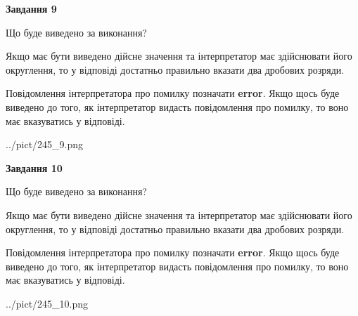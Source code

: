 \documentclass[12pt, ukrainian]{article}
\begin{document}
{\begin {Large}
{\begin {center}\textbf{Завдання 9}\end {center}}\par
Що буде виведено за виконання? \par

Якщо має бути виведено дійсне значення та інтерпретатор має здійснювати його округлення, 
то у відповіді достатньо правильно вказати два дробових розряди.

Повідомлення інтерпретатора про помилку позначати \textbf{error}.
Якщо щось буде виведено до того, як інтерпретатор видасть повідомлення про помилку, 
то воно має вказуватись у відповіді. \par

\begin{center}
	{../pict/245_9.png}
\end{center}
\newpage

{\begin {center}\textbf{Завдання 10}\end {center}}\par
Що буде виведено за виконання? \par

Якщо має бути виведено дійсне значення та інтерпретатор має здійснювати його округлення, 
то у відповіді достатньо правильно вказати два дробових розряди.

Повідомлення інтерпретатора про помилку позначати \textbf{error}.
Якщо щось буде виведено до того, як інтерпретатор видасть повідомлення про помилку, 
то воно має вказуватись у відповіді. \par

\begin{center}
	{../pict/245_10.png}
\end{center}
\newpage

\end {Large}}
\end{document}

